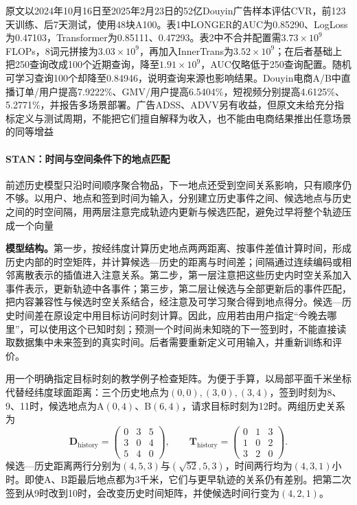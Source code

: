 原文以2024年10月16日至2025年2月23日的52亿Douyin广告样本评估CVR，前123天训练、后7天测试，使用48块A100。表1中LONGER的AUC为0.85290、LogLoss为0.47103，Transformer为0.85111、0.47293。表2中不合并配置需$3.73\times10^9$ FLOPs，8词元拼接为$3.03\times10^9$，再加入InnerTrans为$3.52\times10^9$；在后者基础上把250查询改成100个近期查询，降至$1.91\times10^9$，AUC仅略低于250查询配置。随机可学习查询100个却降至0.84946，说明查询来源也影响结果。Douyin电商A/B中直播订单/用户提高7.9222\%、GMV/用户提高6.5404\%，短视频分别提高4.6125\%、5.2771\%，并报告多场景部署。广告ADSS、ADVV另有收益，但原文未给充分指标定义与测试周期，不能把它们擅自解释为收入，也不能由电商结果推出任意场景的同等增益

\paragraph{STAN：时间与空间条件下的地点匹配}
\label{sec:rs-stan}

前述历史模型只沿时间顺序聚合物品，下一地点还受到空间关系影响，只有顺序仍不够。以用户、地点和签到时间为输入，分别建立历史事件之间、候选地点与历史之间的时空间隔，用两层注意完成轨迹内更新与候选匹配，避免过早将整个轨迹压成一个向量

\textbf{模型结构。}第一步，按经纬度计算历史地点两两距离、按事件差值计算时间，形成历史内部的时空矩阵，并计算候选—历史的距离与时间差；间隔通过连续编码或相邻离散表示的插值进入注意关系。第二步，第一层注意把这些历史内时空关系加入事件表示，更新轨迹中各事件；第三步，第二层让候选与全部更新后的事件匹配，把内容兼容性与候选时空关系结合，经注意及可学习聚合得到地点得分。候选—历史时间差在原设定中用目标访问时刻计算。因此，应用若由用户指定“今晚去哪里”，可以使用这个已知时刻；预测一个时间尚未知晓的下一签到时，不能直接读取数据集中未来签到的真实时间。后者需要重新定义可用输入，并重新训练和评价。

用一个明确指定目标时刻的教学例子检查矩阵。为便于手算，以局部平面千米坐标代替经纬度球面距离：三个历史地点为$(0,0),(3,0),(3,4)$，签到时刻为8、9、11时，候选地点为A$(0,4)$、B$(6,4)$，请求目标时刻为12时。两组历史关系为
\[
  \bm{D}_{\mathrm{history}}=
  \begin{pmatrix}0&3&5\\3&0&4\\5&4&0\end{pmatrix},\qquad
  \bm{T}_{\mathrm{history}}=
  \begin{pmatrix}0&1&3\\1&0&2\\3&2&0\end{pmatrix}.
\]
候选—历史距离两行分别为$(4,5,3)$与$(\sqrt{52},5,3)$，时间两行均为$(4,3,1)$小时。即使A、B距最后地点都为3千米，它们与更早轨迹的关系仍有差别。把第二次签到从9时改到10时，会改变历史时间矩阵，并使候选时间行变为$(4,2,1)$。

